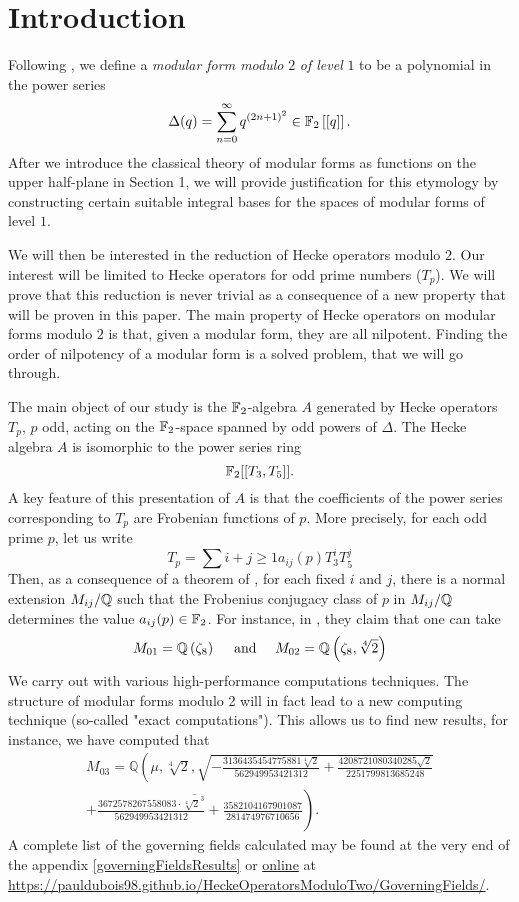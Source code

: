 \setcounter{section}{-1}
\section{Introduction}

Following \cite{OrdreNilpotenceOperateurHecke}, we define a \textit{modular form modulo} $2$ \textit{of level} $1$ to be a polynomial in the power series 
$$
\Delta(q) = \sum_{n = 0}^{\infty}q^{(2n+1)^2} \in \mathbb{F}_2\left[\left[ q \right]\right].
$$
After we introduce the classical theory of modular forms as functions on the upper half-plane in Section 1, we will provide justification for this etymology by constructing certain suitable integral bases for the spaces of modular forms of level $1$.

We will then be interested in the reduction of Hecke operators modulo $2$.
Our interest will be limited to Hecke operators for odd prime numbers ($T_p$).
We will prove that this reduction is never trivial as a consequence of a new property that will be proven in this paper.
The main property of Hecke operators on modular forms modulo $2$ is that, given a modular form, they are all nilpotent.
Finding the order of nilpotency of a modular form is a solved problem, that we will go through.

The main object of our study is the $\mathbb{F}_2$-algebra $A$ generated by Hecke operators $T_p$, $p$ odd, acting on the $\mathbb{F}_2$-space spanned by odd powers of $\Delta$.
The Hecke algebra $A$ is isomorphic to the power series ring 
$$
\mathbb{F}_2[[T_3, T_5]].
$$
A key feature of this presentation of $A$ is that the coefficients of the power series corresponding to $T_p$ are Frobenian functions of $p$.
More precisely, for each odd prime $p$, let us write 
$$
T_p = \sum{i+j \geq 1} a_{ij}(p)T_3^iT_5^j
$$
Then, as a consequence of a theorem of \cite{bellaiche}, for each fixed $i$ and $j$, there is a normal extension $M_{ij}/\mathbb{Q}$ such that the Frobenius conjugacy class of $p$ in $M_{ij}/\mathbb{Q}$ determines the value $a_{ij}(p) \in \mathbb{F}_2$.
For instance, in \cite{OrdreNilpotenceOperateurHecke}, they claim that one can take 
$$
M_{01} = \mathbb{Q}\left( \zeta_8 \right)
\quad \text{ and } \quad 
M_{02} = \mathbb{Q}\left( \zeta_8, \sqrt[4]{2} \right)
$$
We carry out with various high-performance computations techniques.
The structure of modular forms modulo 2 will in fact lead to a new computing technique (so-called "exact computations").
This allows us to find new results, for instance, we have computed that
\begin{multline*}
	M_{03} = \mathbb{Q}\left(\mu, \sqrt[4]{2}, \sqrt{
		- \frac{3136435454775881 \sqrt[4]{2}}{562949953421312} 
		+ \frac{4208721080340285 \sqrt{2}}{2251799813685248} 
	}\right. \\
	\left. \overline{ 
		+ \frac{3672578267558083 \cdot \sqrt[4]{2}^3}{562949953421312} 
		+ \frac{3582104167901087}{281474976710656}
	}\right).
\end{multline*}
A complete list of the governing fields calculated may be found at the very end of the appendix \ref{governingFieldsResults} or \href{https://pauldubois98.github.io/HeckeOperatorsModuloTwo/GoverningFields/}{online} at \url{https://pauldubois98.github.io/HeckeOperatorsModuloTwo/GoverningFields/}.

